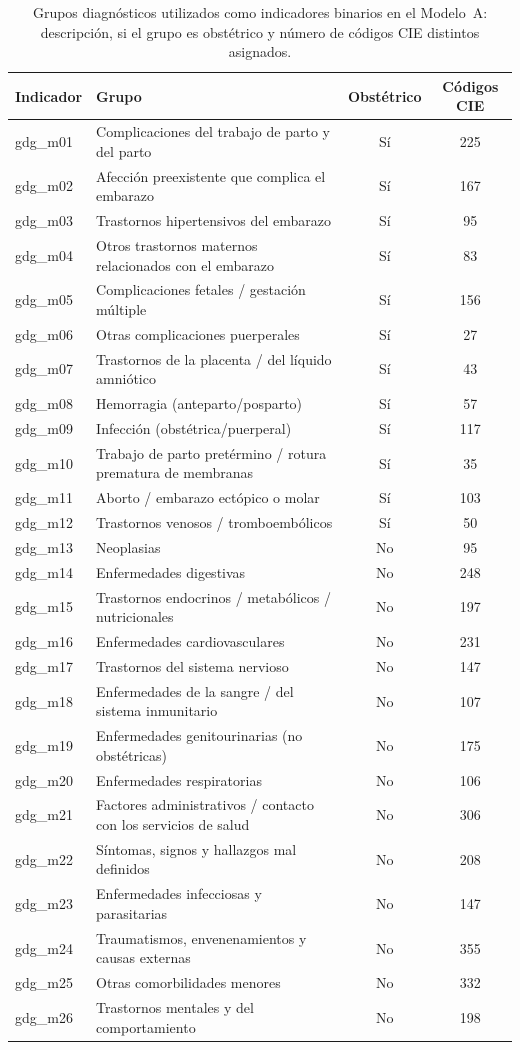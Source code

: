 \documentclass[healthcare,article,submit,pdftex,moreauthors]{Definitions/mdpi_es}
\begin{document}
\begin{table}[H]
\caption{Grupos diagnósticos utilizados como indicadores binarios en el Modelo~A: descripción,
si el grupo es obstétrico y número de códigos CIE distintos asignados.\label{tab:gdg}}
\small
\begin{tabularx}{\textwidth}{lLcc}
\toprule
\textbf{Indicador} & \textbf{Grupo} & \textbf{Obstétrico} & \textbf{Códigos CIE}\\
\midrule
gdg\_m01 & Complicaciones del trabajo de parto y del parto & Sí & 225 \\
gdg\_m02 & Afección preexistente que complica el embarazo & Sí & 167 \\
gdg\_m03 & Trastornos hipertensivos del embarazo & Sí & 95 \\
gdg\_m04 & Otros trastornos maternos relacionados con el embarazo & Sí & 83 \\
gdg\_m05 & Complicaciones fetales / gestación múltiple & Sí & 156 \\
gdg\_m06 & Otras complicaciones puerperales & Sí & 27 \\
gdg\_m07 & Trastornos de la placenta / del líquido amniótico & Sí & 43 \\
gdg\_m08 & Hemorragia (anteparto/posparto) & Sí & 57 \\
gdg\_m09 & Infección (obstétrica/puerperal) & Sí & 117 \\
gdg\_m10 & Trabajo de parto pretérmino / rotura prematura de membranas & Sí & 35 \\
gdg\_m11 & Aborto / embarazo ectópico o molar & Sí & 103 \\
gdg\_m12 & Trastornos venosos / tromboembólicos & Sí & 50 \\
gdg\_m13 & Neoplasias & No & 95 \\
gdg\_m14 & Enfermedades digestivas & No & 248 \\
gdg\_m15 & Trastornos endocrinos / metabólicos / nutricionales & No & 197 \\
gdg\_m16 & Enfermedades cardiovasculares & No & 231 \\
gdg\_m17 & Trastornos del sistema nervioso & No & 147 \\
gdg\_m18 & Enfermedades de la sangre / del sistema inmunitario & No & 107 \\
gdg\_m19 & Enfermedades genitourinarias (no obstétricas) & No & 175 \\
gdg\_m20 & Enfermedades respiratorias & No & 106 \\
gdg\_m21 & Factores administrativos / contacto con los servicios de salud & No & 306 \\
gdg\_m22 & Síntomas, signos y hallazgos mal definidos & No & 208 \\
gdg\_m23 & Enfermedades infecciosas y parasitarias & No & 147 \\
gdg\_m24 & Traumatismos, envenenamientos y causas externas & No & 355 \\
gdg\_m25 & Otras comorbilidades menores & No & 332 \\
gdg\_m26 & Trastornos mentales y del comportamiento & No & 198 \\
\bottomrule
\end{tabularx}
\end{table}
\end{document}

